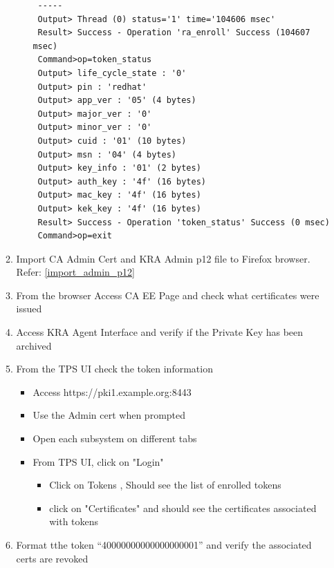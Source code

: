 \documentclass[a4paper]{article}
\begin{document}
\begin{enumerate}[label*=\arabic*.]
\begin{enumerate}[label*=\arabic*.]
\begin{itemize}
                        \begin{lstlisting}
 -----
 Output> Thread (0) status='1' time='104606 msec'
 Result> Success - Operation 'ra_enroll' Success (104607 msec)
 Command>op=token_status
 Output> life_cycle_state : '0'
 Output> pin : 'redhat'
 Output> app_ver : '05' (4 bytes)
 Output> major_ver : '0'
 Output> minor_ver : '0'
 Output> cuid : '01' (10 bytes)
 Output> msn : '04' (4 bytes)
 Output> key_info : '01' (2 bytes)
 Output> auth_key : '4f' (16 bytes)
 Output> mac_key : '4f' (16 bytes)
 Output> kek_key : '4f' (16 bytes)
 Result> Success - Operation 'token_status' Success (0 msec)
 Command>op=exit
                        \end{lstlisting}
                \end{itemize}
            \item \label{token_ex5} Import CA Admin Cert and KRA Admin p12 file to Firefox browser. Refer: \ref{import_admin_p12}
            \item \label{token_ex6} From the browser Access CA EE Page and check what certificates were issued
            \item \label{token_ex7} Access KRA Agent Interface and verify if the Private Key has been archived
            \item \label{token_ex8} From the TPS UI check the token information 
                \begin{itemize}
                    \item Access https://pki1.example.org:8443
                    \item Use the Admin cert when prompted
                    \item Open each subsystem on different tabs
                    \item From TPS UI, click on "Login"
                        \begin{itemize}
                            \item Click on Tokens , Should see the list of enrolled tokens
                            \item click on "Certificates" and should see the certificates associated with tokens
                        \end{itemize}
                \end{itemize}
            \item \label{token_ex9}Format tthe token ``40000000000000000001'' and verify the associated certs are revoked
                \begin{itemize}

\end{itemize}
\end{enumerate}
\end{enumerate}
\end{document}
